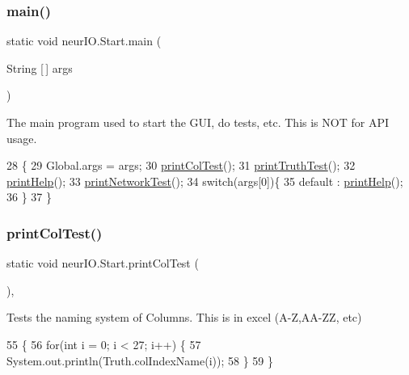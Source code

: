\subsubsection{\texorpdfstring{main()}{main()}}
{\footnotesize\ttfamily static void neur\+I\+O.\+Start.\+main (\begin{DoxyParamCaption}\item[{String \mbox{[}$\,$\mbox{]}}]{args }\end{DoxyParamCaption})\hspace{0.3cm}{\ttfamily [static]}}

The main program used to start the G\+UI, do tests, etc. This is N\+OT for A\+PI usage. 
\begin{DoxyCode}
28                                            \{
29         Global.args = args;
30         \hyperlink{classneur_i_o_1_1_start_a2e18a32a484aa296caae592b4c8b9acd}{printColTest}();
31         \hyperlink{classneur_i_o_1_1_start_aedb59a7fabe14787e4d792a87bb23c7b}{printTruthTest}();
32         \hyperlink{classneur_i_o_1_1_start_ae057e60dad95a9bd37e41c860cae2fab}{printHelp}();
33         \hyperlink{classneur_i_o_1_1_start_ae0f93675889ad60b4c42b39a64e94910}{printNetworkTest}();
34         \textcolor{keywordflow}{switch}(args[0])\{
35             default : \hyperlink{classneur_i_o_1_1_start_ae057e60dad95a9bd37e41c860cae2fab}{printHelp}();
36         \}
37     \}
\end{DoxyCode}
\mbox{\label{classneur_i_o_1_1_start_a2e18a32a484aa296caae592b4c8b9acd}} 
\subsubsection{\texorpdfstring{print\+Col\+Test()}{printColTest()}}
{\footnotesize\ttfamily static void neur\+I\+O.\+Start.\+print\+Col\+Test (\begin{DoxyParamCaption}{ }\end{DoxyParamCaption})\hspace{0.3cm}{\ttfamily [static]}, {\ttfamily [private]}}

Tests the naming system of Columns. This is in excel (A-\/Z,A\+A-\/\+ZZ, etc) 
\begin{DoxyCode}
55                                        \{
56         \textcolor{keywordflow}{for}(\textcolor{keywordtype}{int} i = 0; i < 27; i++) \{
57             System.out.println(Truth.colIndexName(i));
58         \}
59     \}
\end{DoxyCode}
\mbox{\label{classneur_i_o_1_1_start_ae057e60dad95a9bd37e41c860cae2fab}} 
